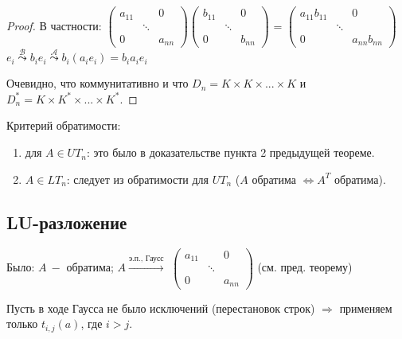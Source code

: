 \begin{proof}
    В частности: $\begin{pmatrix}
                      a_{11} & & 0 \\
                      & \ddots &  \\
                      0 & & a_{nn}
    \end{pmatrix}$\cdot $\begin{pmatrix}
                             b_{11} & & 0 \\
                             & \ddots &  \\
                             0 & & b_{nn}
    \end{pmatrix} $ = $\begin{pmatrix}
                           a_{11}b_{11} & & 0 \\
                           & \ddots &  \\
                           0 & & a_{nn}b_{nn}
    \end{pmatrix} $   $e_i\overset{\mathcal{B}}{\leadsto} b_ie_i \overset{\mathcal{A}}{\leadsto}b_i(a_ie_i)=b_ia_ie_i$

    Очевидно, что коммунитативно и что $D_n=K\times K\times ... \times K$ и $D^*_n=K\times K^*\times ... \times K^*$.
\end{proof}

Критерий обратимости:
\begin{enumerate}
    \item для $A\in UT_n$: это было в доказательстве пункта 2 предыдущей теореме.
    \item $A\in LT_n$: следует из обратимости для $UT_n$ ($A$ обратима $\Leftrightarrow A^T$ обратима).
\end{enumerate}

\subsection{LU-разложение}

Было: $A\ -$ обратима; $A\overset{\text{э.п., Гаусс}}{\rightarrow}$ $\begin{pmatrix}
                                                                         a_{11} & & 0 \\
                                                                         & \ddots &  \\
                                                                         0 & & a_{nn}
\end{pmatrix}$ (см. пред. теорему)

Пусть в ходе Гаусса не было исключений (перестановок строк) $\Rightarrow$ применяем только $t_{i,j}(a)$, где $i>j$.

